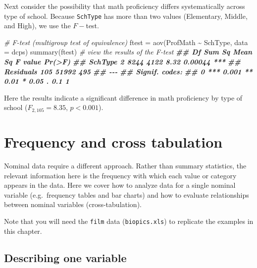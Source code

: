 \documentclass[
  12pt,
]{krantz}
\newenvironment{Shaded}{\begin{snugshade}}{\end{snugshade}}
\newcommand{\AttributeTok}[1]{\textcolor[rgb]{0.77,0.63,0.00}{#1}}
\newcommand{\CommentTok}[1]{\textcolor[rgb]{0.56,0.35,0.01}{\textit{#1}}}
\newcommand{\DocumentationTok}[1]{\textcolor[rgb]{0.56,0.35,0.01}{\textbf{\textit{#1}}}}
\newcommand{\FunctionTok}[1]{\textcolor[rgb]{0.00,0.00,0.00}{#1}}
\newcommand{\NormalTok}[1]{#1}
\newcommand{\OtherTok}[1]{\textcolor[rgb]{0.56,0.35,0.01}{#1}}
\newcommand{\SpecialCharTok}[1]{\textcolor[rgb]{0.00,0.00,0.00}{#1}}
\begin{document}
Next consider the possibility that math proficiency differs systematically across type of school. Because \texttt{SchType} has more than two values (Elementary, Middle, and High), we use the \(F-\)test.

\begin{Shaded}
\begin{Highlighting}[]
\CommentTok{\# F{-}test (multigroup test of equivalence)  }
\NormalTok{  ftest }\OtherTok{=} \FunctionTok{aov}\NormalTok{(ProfMath }\SpecialCharTok{\textasciitilde{}}\NormalTok{ SchType, }\AttributeTok{data =}\NormalTok{ dcps)}
  \FunctionTok{summary}\NormalTok{(ftest) }\CommentTok{\# view the results of the F{-}test}
\DocumentationTok{\#\#              Df Sum Sq Mean Sq F value  Pr(\textgreater{}F)    }
\DocumentationTok{\#\# SchType       2   8244    4122    8.32 0.00044 ***}
\DocumentationTok{\#\# Residuals   105  51992     495                    }
\DocumentationTok{\#\# {-}{-}{-}}
\DocumentationTok{\#\# Signif. codes:  }
\DocumentationTok{\#\# 0 \textquotesingle{}***\textquotesingle{} 0.001 \textquotesingle{}**\textquotesingle{} 0.01 \textquotesingle{}*\textquotesingle{} 0.05 \textquotesingle{}.\textquotesingle{} 0.1 \textquotesingle{} \textquotesingle{} 1}
\end{Highlighting}
\end{Shaded}

Here the results indicate a significant difference in math proficiency by type of school (\(F_{2,105}=8.35\), \(p<0.001\)).

\hypertarget{frequency-and-cross-tabulation}{%
\chapter{Frequency and cross tabulation}\label{frequency-and-cross-tabulation}}

Nominal data require a different approach. Rather than summary statistics, the relevant information here is the frequency with which each value or category appears in the data. Here we cover how to analyze data for a single nominal variable (e.g.~frequency tables and bar charts) and how to evaluate relationships between nominal variables (cross-tabulation).

Note that you will need the \texttt{film} data (\texttt{biopics.xls}) to replicate the examples in this chapter.

\hypertarget{describing-one-variable-1}{%
\section{Describing one variable}\label{describing-one-variable-1}}
\end{document}
